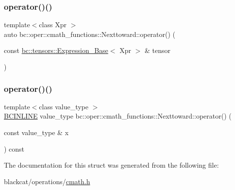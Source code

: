 \mbox{\label{structbc_1_1oper_1_1cmath__functions_1_1Nexttoward_ae142532842ac9dabed9605a467c4ca22}} 
\subsubsection{\texorpdfstring{operator()()}{operator()()}\hspace{0.1cm}{\footnotesize\ttfamily [2/3]}}
{\footnotesize\ttfamily template$<$class Xpr $>$ \\
auto bc\+::oper\+::cmath\+\_\+functions\+::\+Nexttoward\+::operator() (\begin{DoxyParamCaption}\item[{const \hyperlink{classbc_1_1tensors_1_1Expression__Base}{bc\+::tensors\+::\+Expression\+\_\+\+Base}$<$ Xpr $>$ \&}]{tensor }\end{DoxyParamCaption})\hspace{0.3cm}{\ttfamily [inline]}}

\mbox{\label{structbc_1_1oper_1_1cmath__functions_1_1Nexttoward_a328f7b9ee1f514b5a34cb47fb2039232}} 
\subsubsection{\texorpdfstring{operator()()}{operator()()}\hspace{0.1cm}{\footnotesize\ttfamily [3/3]}}
{\footnotesize\ttfamily template$<$class value\+\_\+type $>$ \\
\hyperlink{common_8h_a6699e8b0449da5c0fafb878e59c1d4b1}{B\+C\+I\+N\+L\+I\+NE} value\+\_\+type bc\+::oper\+::cmath\+\_\+functions\+::\+Nexttoward\+::operator() (\begin{DoxyParamCaption}\item[{const value\+\_\+type \&}]{x }\end{DoxyParamCaption}) const\hspace{0.3cm}{\ttfamily [inline]}}



The documentation for this struct was generated from the following file\+:\begin{DoxyCompactItemize}
\item 
blackcat/operations/\hyperlink{cmath_8h}{cmath.\+h}\end{DoxyCompactItemize}

